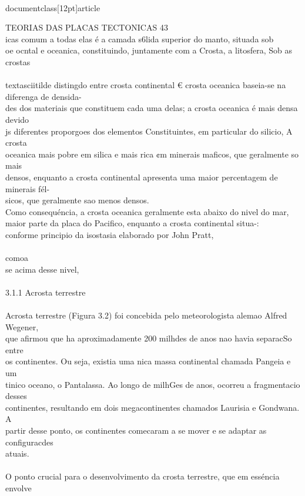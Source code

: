 \\documentclass[12pt]{article}
\begin{document}
TEORIAS DAS PLACAS TECTONICAS 43\\
icas comum a todas elas é a camada s6lida superior do manto, situada sob\\
oe ocntal e oceanica, constituindo, juntamente com a Crosta, a litosfera, Sob as crostas\\
\\textasciitilde{} distingdo entre crosta continental € crosta oceanica baseia-se na diferenga de densida-\\
des dos materiais que constituem cada uma delas; a crosta oceanica é mais densa devido\\
js diferentes proporgoes dos elementos Constituintes, em particular do silicio, A crosta\\
oceanica mais pobre em silica e mais rica ¢m minerais maficos, que geralmente so mais\\
densos, enquanto a crosta continental apresenta uma maior percentagem de minerais fél-\\
sicos, que geralmente sao menos densos.\\
Como consequéncia, a crosta oceanica geralmente esta abaixo do nivel do mar,\\
maior parte da placa do Pacifico, enquanto a crosta continental situa-:\\
conforme principio da isostasia elaborado por John Pratt,\\
\\
comoa\\
se acima desse nivel,\\
\\
3.1.1 Acrosta terrestre\\
\\
Acrosta terrestre (Figura 3.2) foi concebida pelo meteorologista alemao Alfred Wegener,\\
que afirmou que ha aproximadamente 200 milhdes de anos nao havia separacSo entre\\
os continentes. Ou seja, existia uma nica massa continental chamada Pangeia e um\\
tinico oceano, o Pantalassa. Ao longo de milhGes de anos, ocorreu a fragmentacio desses\\
continentes, resultando em dois megacontinentes chamados Laurisia e Gondwana. A\\
partir desse ponto, os continentes comecaram a se mover e se adaptar as configuracdes\\
atuais.\\
\\
O ponto crucial para o desenvolvimento da crosta terrestre, que em esséncia envolve\\
\end{document}
